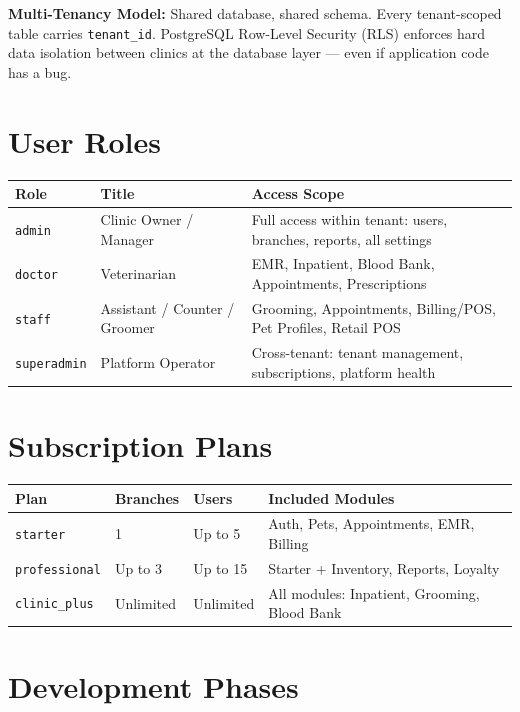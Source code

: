 \documentclass[12pt,a4paper]{report}
\begin{document}
\begin{mdframed}[style=InfoBox]
\textbf{Multi-Tenancy Model:} Shared database, shared schema. Every tenant-scoped table carries \texttt{tenant\_id}. PostgreSQL Row-Level Security (RLS) enforces hard data isolation between clinics at the database layer --- even if application code has a bug.
\end{mdframed}

\section{User Roles}

\begin{longtable}{L{2.5cm} L{3.5cm} L{8cm}}
\toprule
\textbf{Role} & \textbf{Title} & \textbf{Access Scope} \\\midrule\endhead\bottomrule\endfoot
\texttt{admin}      & Clinic Owner / Manager     & Full access within tenant: users, branches, reports, all settings \\
\texttt{doctor}     & Veterinarian               & EMR, Inpatient, Blood Bank, Appointments, Prescriptions \\
\texttt{staff}      & Assistant / Counter / Groomer & Grooming, Appointments, Billing/POS, Pet Profiles, Retail POS \\
\texttt{superadmin} & Platform Operator          & Cross-tenant: tenant management, subscriptions, platform health \\
\end{longtable}

\section{Subscription Plans}

\begin{longtable}{L{3cm} L{2.5cm} L{2.5cm} L{5.5cm}}
\toprule
\textbf{Plan} & \textbf{Branches} & \textbf{Users} & \textbf{Included Modules} \\\midrule\endhead\bottomrule\endfoot
\texttt{starter}       & 1        & Up to 5   & Auth, Pets, Appointments, EMR, Billing \\
\texttt{professional}  & Up to 3  & Up to 15  & Starter + Inventory, Reports, Loyalty \\
\texttt{clinic\_plus}  & Unlimited & Unlimited & All modules: Inpatient, Grooming, Blood Bank \\
\end{longtable}

\section{Development Phases}
\end{document}
